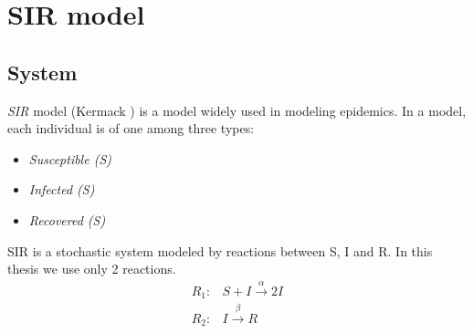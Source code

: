 \section{SIR model}
\subsection{System}
\textit{SIR} model (Kermack \cite{kermack1927contribution}) is a model widely used in modeling
epidemics. In a  model, each individual is of one among three types:
\begin{itemize}
    \item \textit{Susceptible (S)}
    \item \textit{Infected (S)}
    \item \textit{Recovered (S)}
\end{itemize}
SIR is a stochastic system modeled by reactions between S, I and R. In this thesis we use
only 2 reactions.
\begin{align*}
    R_1: & S + I \xrightarrow{\alpha} 2I \\
    R_2: & I     \xrightarrow{\beta} R
\end{align*}

